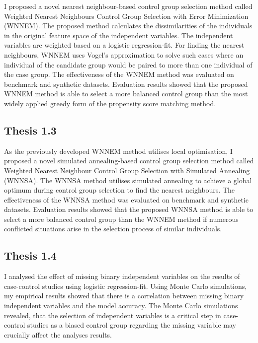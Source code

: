 		I proposed a novel nearest neighbour-based control group selection method called Weighted Nearest Neighbours Control Group Selection with Error Minimization (WNNEM). The proposed method calculates the dissimilarities of the individuals in the original feature space of the independent variables. The independent variables are weighted based on a logistic regression-fit. For finding the nearest neighbours, WNNEM uses Vogel's approximation to solve such cases where an individual of the candidate group would be paired to more than one individual of the case group. The effectiveness of the WNNEM method was evaluated on benchmark and synthetic datasets. Evaluation results showed that the proposed WNNEM method is able to select a more balanced control group than the most widely applied greedy form of the propensity score matching method.
		  
						
		\subsection*{Thesis 1.3}
						        
		As the previously developed WNNEM method utilises local optimisation, I proposed a novel simulated annealing-based control group selection method called Weighted Nearest Neighbour Control Group Selection with Simulated Annealing (WNNSA). The WNNSA method utilises simulated annealing to achieve a global optimum during control group selection to find the nearest neighbours. The effectiveness of the WNNSA method was evaluated on benchmark and synthetic datasets. Evaluation results showed that the proposed WNNSA method is able to select a more balanced control group than the WNNEM method if numerous conflicted situations arise in the selection process of similar individuals.
						        
		\subsection*{Thesis 1.4}
						        
		I analysed the effect of missing binary independent variables on the results of case-control studies using logistic regression-fit. Using Monte Carlo simulations, my empirical results showed that there is a correlation between missing binary independent variables and the model accuracy. The Monte Carlo simulations revealed, that the selection of independent variables is a critical step in case-control studies as a biased control group regarding the missing variable may crucially affect the analyses results.  
		  
